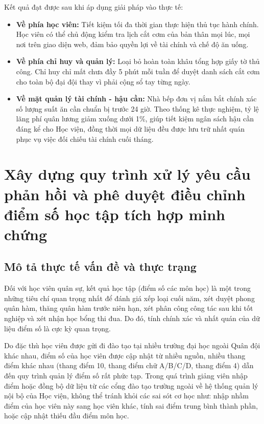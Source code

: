 \documentclass[../DoAn.tex]{subfiles}
\begin{document}
Kết quả đạt được sau khi áp dụng giải pháp vào thực tế:
\begin{itemize}
    \item \textbf{Về phía học viên:} Tiết kiệm tối đa thời gian thực hiện thủ tục hành chính. Học viên có thể chủ động kiểm tra lịch cắt cơm của bản thân mọi lúc, mọi nơi trên giao diện web, đảm bảo quyền lợi về tài chính và chế độ ăn uống.
    \item \textbf{Về phía chỉ huy và quản lý:} Loại bỏ hoàn toàn khâu tổng hợp giấy tờ thủ công. Chỉ huy chỉ mất chưa đầy 5 phút mỗi tuần để duyệt danh sách cắt cơm cho toàn bộ đại đội thay vì phải cộng sổ tay từng ngày.
    \item \textbf{Về mặt quản lý tài chính - hậu cần:} Nhà bếp đơn vị nắm bắt chính xác số lượng suất ăn cần chuẩn bị trước 24 giờ. Theo thống kê thực nghiệm, tỷ lệ lãng phí quân lương giảm xuống dưới 1\%, giúp tiết kiệm ngân sách hậu cần đáng kể cho Học viện, đồng thời mọi dữ liệu đều được lưu trữ nhất quán phục vụ việc đối chiếu tài chính cuối tháng.
\end{itemize}

\section{Xây dựng quy trình xử lý yêu cầu phản hồi và phê duyệt điều chỉnh điểm số học tập tích hợp minh chứng}
\label{section:5.2}

\subsection{Mô tả thực tế vấn đề và thực trạng}
\label{subsection:5.2.1}
Đối với học viên quân sự, kết quả học tập (điểm số các môn học) là một trong những tiêu chí quan trọng nhất để đánh giá xếp loại cuối năm, xét duyệt phong quân hàm, thăng quân hàm trước niên hạn, xét phân công công tác sau khi tốt nghiệp và xét nhận học bổng thi đua. Do đó, tính chính xác và nhất quán của dữ liệu điểm số là cực kỳ quan trọng.

Do đặc thù học viên được gửi đi đào tạo tại nhiều trường đại học ngoài Quân đội khác nhau, điểm số của học viên được cập nhật từ nhiều nguồn, nhiều thang điểm khác nhau (thang điểm 10, thang điểm chữ A/B/C/D, thang điểm 4) dẫn đến quy trình quản lý điểm số rất phức tạp. Trong quá trình giảng viên nhập điểm hoặc đồng bộ dữ liệu từ các cổng đào tạo trường ngoài về hệ thống quản lý nội bộ của Học viện, không thể tránh khỏi các sai sót cơ học như: nhập nhầm điểm của học viên này sang học viên khác, tính sai điểm trung bình thành phần, hoặc cập nhật thiếu đầu điểm môn học.
\end{document}
